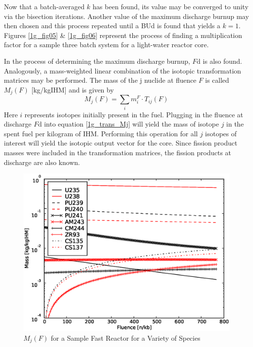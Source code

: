Now that a batch-averaged $k$ has been found, its value may be converged to unity via the bisection iterations.  Another 
value of the maximum discharge burnup may then chosen and this process repeated until a BUd is found 
that yields a $k = 1$.  Figures \ref{1g_fig05} \& \ref{1g_fig06} represent the process of finding a 
multiplication factor for a sample three batch system for a light-water reactor core.  

In the process of determining the maximum discharge burnup, $F\mbox{d}$ is also found.  Analogously, a  
mass-weighted linear combination of the isotopic transformation matrices may be performed. 
The mass of the j 
nuclide at fluence $F$ is called $M_j(F)$ [kg/kgIHM] and is given by
\begin{equation}
\label{1g_trans_Mj}
M_j(F) = \sum_i m_i^F \cdot T_{ij}(F)
\end{equation}
Here $i$ represents isotopes initially present in the fuel.  Plugging in the fluence at discharge 
$F\mbox{d}$ into equation \ref{1g_trans_Mj} will yield the mass of isotope $j$ in the spent fuel per 
kilogram of IHM.  Performing this operation for all $j$ isotopes of interest will yield the isotopic 
output vector for the core.  Since fission product masses were included in the transformation matrices, 
the fission products at discharge are also known.  

\begin{figure}[htbp]
\caption{$M_j(F)$ for a Sample Fast Reactor for a Variety of Species}
\label{1g_fig07}
\begin{center}
\includegraphics[scale=0.5]{one_group_method/figs/Fig07.eps}
\end{center}
\end{figure}

